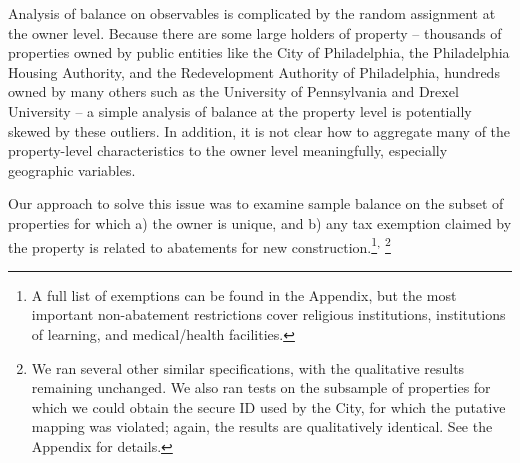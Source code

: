 \documentclass[12pt,titlepage]{article}
\begin{document}
Analysis of balance on observables is complicated by the random
assignment at the owner level.  Because there are some large holders of property  -- thousands of
properties owned by public entities like the City of Philadelphia, the
Philadelphia Housing Authority, and the Redevelopment Authority of
Philadelphia, hundreds owned by many others such as the University of
Pennsylvania and Drexel University -- a simple analysis of balance at
the property level is potentially skewed by these outliers. In addition,
it is not clear how to aggregate many of the property-level
characteristics to the owner level meaningfully, especially geographic
variables.

Our approach to solve this issue was to examine sample balance on the
subset of properties for which a) the owner is unique, and b) any tax exemption claimed by the property is
related to abatements for new construction.\footnote{A full list of
  exemptions can be found in the Appendix, but the most important
  non-abatement restrictions cover religious institutions,
  institutions of learning, and medical/health
  facilities.}\textsuperscript{,}
\footnote{We ran several other similar specifications, with the 
qualitative results remaining unchanged. We also ran tests on the subsample of properties for which
we could obtain the secure ID used by the City, for which the putative mapping was violated; again, the
results are qualitatively identical. See the Appendix for details.}
\end{document}
